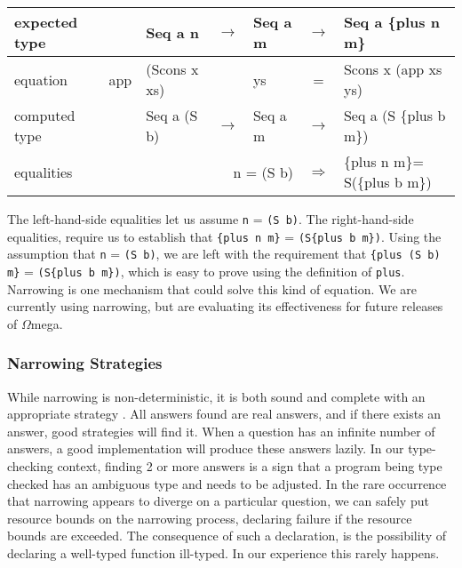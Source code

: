 \documentclass[11pt,twoside]{article}
\newcommand{\om}{$\Omega$mega}
\newcommand{\plus}[2]{\{plus {#1} {#2}\}}
\begin{document}
\vspace*{.1in}
\begin{tabular}{|l|rlclcl|} \hline
{\small expected type} & &{\small{{Seq a n}}} & $\rightarrow$ & {\small{{Seq a m}}} & $\rightarrow$ &  {\small{{Seq a \plus{n}{m}}}}\\ \hline
{\small equation} & {\small{app}}&  {\small{{(Scons x xs)}}} & &  {\small{{ys}}} & = & {\small{{Scons x (app xs ys)}}} \\ \hline
{\small computed type} & & {\small{{Seq a (S b)}}} & $\rightarrow$ & {\small{{Seq a m}}} & $\rightarrow$ & {\small{{Seq a (S \plus{b}{m})}}}  \\ \hline
{\small equalities}    & & \multicolumn{3}{r}{\small{{n = (S b)}}} & $\Rightarrow$ & {\small{{\plus{n}{m}= S(\plus{b}{m})}}} \\ \hline 
\end{tabular}
\vspace*{.1in}

The left-hand-side equalities let us
assume \verb+n+ = \verb+(S b)+. The right-hand-side equalities, require us
to establish that \verb+{plus n m}+ = \verb+(S{plus b m})+.   Using the assumption that 
\verb+n+ = \verb+(S b)+, we are left with the requirement that \verb+{plus (S b) m}+ = \verb+(S{plus b m})+,
which is easy to prove using the definition of \verb+plus+. Narrowing is one
mechanism that could solve this kind of equation. We are currently using
narrowing, but are evaluating its effectiveness for future releases of \om.

\subsubsection{Narrowing Strategies} \label{ISEQ}

While narrowing is non-deterministic, it is both sound and complete with an
appropriate strategy \cite{Antoy:2005:ESF}. All answers found are real answers, and if
there exists an answer, good strategies will find it. When a question has an infinite
number of answers, a good implementation will produce these answers lazily.  In our
type-checking context, finding 2 or more answers is a sign that a program being type
checked has an ambiguous type and needs to be adjusted. In the rare occurrence that
narrowing appears to diverge on a particular question, we can safely put resource
bounds on the narrowing process, declaring failure if the resource bounds are
exceeded. The consequence of such a declaration, is the possibility of declaring a 
well-typed function ill-typed. In our experience this rarely happens.
\end{document}
